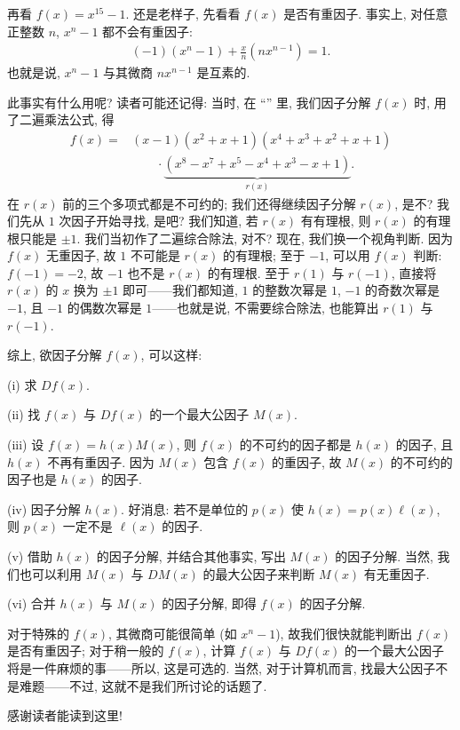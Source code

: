 \begin{example}
    再看 $f(x) = x^{15} - 1$. 还是老样子, 先看看 $f(x)$ 是否有重因子. 事实上, 对任意正整数 $n$, $x^n - 1$ 都不会有重因子:
    \begin{align*}
        (-1) (x^n - 1) + \frac{x}{n} (nx^{n-1}) = 1.
    \end{align*}
    也就是说, $x^n - 1$ 与其微商 $nx^{n-1}$ 是互素的.

    此事实有什么用呢? 读者可能还记得: 当时, 在 ``\FactorsOfHigherDegreeOfPolynomialsOverQ'' 里, 我们因子分解 $f(x)$ 时, 用了二遍乘法公式, 得
    \begin{align*}
        f(x)
        = {} & (x-1) (x^2+x+1) (x^4+x^3+x^2+x+1)                           \\
             & \qquad \cdot \underbrace{(x^8-x^7+x^5-x^4+x^3-x+1)}_{r(x)}.
    \end{align*}
    在 $r(x)$ 前的三个多项式都是不可约的; 我们还得继续因子分解 $r(x)$, 是不? 我们先从 $1$ 次因子开始寻找, 是吧? 我们知道, 若 $r(x)$ 有有理根, 则 $r(x)$ 的有理根只能是 $\pm 1$. 我们当初作了二遍综合除法, 对不? 现在, 我们换一个视角判断. 因为 $f(x)$ 无重因子, 故 $1$ 不可能是 $r(x)$ 的有理根; 至于 $-1$, 可以用 $f(x)$ 判断: $f(-1) = -2$, 故 $-1$ 也不是 $r(x)$ 的有理根. 至于 $r(1)$ 与 $r(-1)$, 直接将 $r(x)$ 的 $x$ 换为 $\pm 1$ 即可——我们都知道, $1$ 的整数次幂是 $1$, $-1$ 的奇数次幂是 $-1$, 且 $-1$ 的偶数次幂是 $1$——也就是说, 不需要综合除法, 也能算出 $r(1)$ 与 $r(-1)$.
\end{example}

综上, 欲因子分解 $f(x)$, 可以这样:

(i) 求 $Df(x)$.

(ii) 找 $f(x)$ 与 $Df(x)$ 的一个最大公因子 $M(x)$.

(iii) 设 $f(x) = h(x) M(x)$, 则 $f(x)$ 的不可约的因子都是 $h(x)$ 的因子, 且 $h(x)$ 不再有重因子. 因为 $M(x)$ 包含 $f(x)$ 的重因子, 故 $M(x)$ 的不可约的因子也是 $h(x)$ 的因子.

(iv) 因子分解 $h(x)$. 好消息: 若不是单位的 $p(x)$ 使 $h(x) = p(x) \ell(x)$, 则 $p(x)$ 一定不是 $\ell (x)$ 的因子.

(v) 借助 $h(x)$ 的因子分解, 并结合其他事实, 写出 $M(x)$ 的因子分解. 当然, 我们也可以利用 $M(x)$ 与 $DM(x)$ 的最大公因子来判断 $M(x)$ 有无重因子.

(vi) 合并 $h(x)$ 与 $M(x)$ 的因子分解, 即得 $f(x)$ 的因子分解.

对于特殊的 $f(x)$, 其微商可能很简单 (如 $x^n - 1$), 故我们很快就能判断出 $f(x)$ 是否有重因子; 对于稍一般的 $f(x)$, 计算 $f(x)$ 与 $Df(x)$ 的一个最大公因子将是一件麻烦的事——所以, 这是可选的. 当然, 对于计算机而言, 找最大公因子不是难题——不过, 这就不是我们所讨论的话题了.

感谢读者能读到这里!
